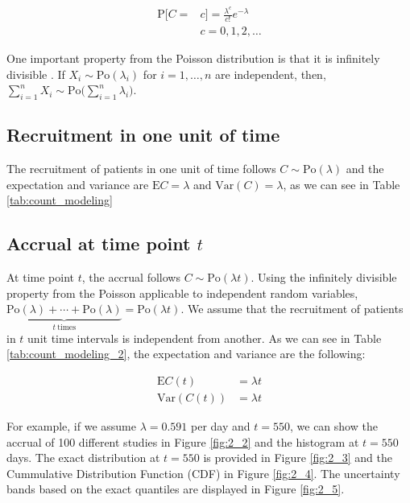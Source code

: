 \begin{align*}
\textrm{P}[C=&c] = \frac{\lambda^c}{c!}e^{-\lambda} \\
&c = 0,1,2,\ldots
\end{align*}


One important property from the Poisson distribution is that it is infinitely divisible \citep{held2014applied}. If $X_i\sim \textrm{Po} (\lambda_i)$ for $i=1,\ldots, n$ are independent, then, $\sum_{i=1}^n X_i \sim \textrm{Po} \Big( \sum_{i=1}^n \lambda_i \Big)$.

\subsection{Recruitment in one unit of time}

The recruitment of patients in one unit of time follows $C\sim \textrm{Po} (\lambda)$ and the expectation and variance are
$\textrm{E}C = \lambda$ and $\textrm{Var}(C) = \lambda$, as we can see in Table \ref{tab:count_modeling}

\subsection{Accrual at time point $t$}
At time point $t$, the accrual follows $C\sim \textrm{Po} (\lambda t)$. Using the infinitely divisible property from the Poisson applicable to independent random variables, $\underbrace{\textrm{Po} (\lambda) +\cdots +\textrm{Po} (\lambda)}_{t \ \text{times}} = \textrm{Po} (\lambda t)$. We assume that the recruitment of patients in $t$ unit time intervals is independent from another. As we can see in Table \ref{tab:count_modeling_2}, the expectation and variance are the following:

\begin{align*}
\textrm{E}C(t) & = \lambda t \\
\textrm{Var}(C(t)) & = \lambda t
\end{align*}

For example, if we assume $\lambda = 0.591$ per day and $t=550$, we can show the accrual of 100 different studies in Figure \ref{fig:2_2} and the histogram at $t=550$ days. The exact distribution at $t=550$ is provided in Figure \ref{fig:2_3} and the Cummulative Distribution Function (CDF) in Figure \ref{fig:2_4}. The uncertainty bands based on the exact quantiles are displayed in Figure \ref{fig:2_5}.

